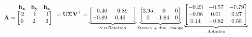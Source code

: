 \documentclass[preview]{standalone}
\begin{document}
\begin{align*}
\begin{array}{ccc}\begin{matrix}\hspace{0.75cm} \mathbf{b_{x}} &  \mathbf{b_{y}} &  \mathbf{b_{z}} \end{matrix} \\ \mathbf{A} = \begin{bmatrix} 2 & \hspace{0.1cm} 1 \hspace{0.1cm}& \hspace{0.1cm} 1 \\ \hspace{0.04cm}  0 \hspace{0.1cm} & \hspace{0.1cm} 2 \hspace{0.1cm}\hspace{0.1cm} & 3 \end{bmatrix} \end{array}= \mathbf{U \Sigma V^\top}= \underbrace{\begin{bmatrix} -0.46 & -0.89 & \\ -0.89 & 0.46 \end{bmatrix}}_{text{Rotation}} \underbrace{\begin{bmatrix} 3.95 & 0 & 0 \\0 & 1.84 & 0 \end{bmatrix}}_{\text{Stretch + dim. change}}\underbrace{\begin{bmatrix} -0.23 & -0.57 & -0.79 \\-0.96 & 0.01 & 0.27 \\ 0.14 & -0.82 & 0.55 \end{bmatrix}}_{\text{Rotation}}
\end{align*}
\end{document}
